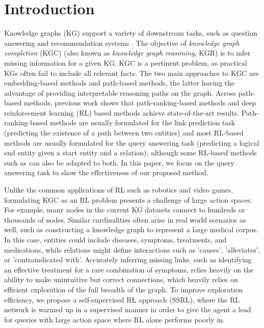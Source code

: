 \documentclass[lettersize,journal]{IEEEtran}
\begin{document}
\section{Introduction}
Knowledge graphs (KG) support a variety of downstream tasks, such as question answering and recommendation systems \cite{yu-etal-2022-kg,he-etal-2017-learning,moon-etal-2019-opendialkg,huang2019knowledge}. The objective of \textit{knowledge graph completion} (KGC) (also known as \textit{knowledge graph reasoning}, KGR)  is to infer missing information for a given KG. KGC is a pertinent problem, as practical KGs often fail to include all relevant facts. The two main approaches to KGC are embedding-based methods and path-based methods, the latter having the advantage of providing interpretable reasoning paths on the graph. Across path-based methods, previous work shows that path-ranking-based methods and deep reinforcement learning (RL) based methods \cite{minerva,shen2018m,LinRX2018:MultiHopKG} achieve state-of-the-art results. Path-ranking-based methods are usually formulated for the link prediction task (predicting the existence of a path between two entities) and most RL-based methods are usually formulated for the query answering task (predicting a logical end entity given a start entity and a relation), although some RL-based methods such as \cite{wenhan_emnlp2017} can also be adapted to both. In this paper, we focus on the query answering task to show the effectiveness of our proposed method.

Unlike the common applications of RL such as robotics and video games, formulating KGC as an RL problem presents a challenge of large action spaces. For example, many nodes in the current KG datasets connect to hundreds or thousands of nodes. Similar cardinalities often arise in real world scenarios as well, such as constructing a knowledge graph to represent a large medical corpus. In this case, entities could include diseases, symptoms, treatments, and medications, while relations might define interactions such as 'causes', 'alleviates', or 'contraindicated with'. Accurately inferring missing links, such as identifying an effective treatment for a rare combination of symptoms, relies heavily on the ability to make unintuitive but correct connections, which heavily relies on efficient exploration of the full breadth of the graph. To improve exploration efficiency, we propose a self-supervised RL approach (SSRL), where the RL network is warmed up in a supervised manner in order to give the agent a lead for queries with large action space where RL alone performs poorly in.
\end{document}
